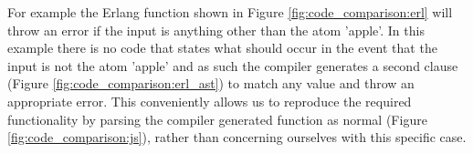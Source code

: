 \documentclass[twoside,12pt,titlepage,a4paper]{article}
\begin{document}
For example the Erlang function shown in Figure \ref{fig:code_comparison:erl} will throw an error if the input is anything other than the atom 'apple'. In this example there is no code that states what should occur in the event that the input is not the atom 'apple' and as such the compiler generates a second clause (Figure \ref{fig:code_comparison:erl_ast}) to match any value and throw an appropriate error. This conveniently allows us to reproduce the required functionality by parsing the compiler generated function as normal (Figure \ref{fig:code_comparison:js}), rather than concerning ourselves with this specific case.
\end{document}
